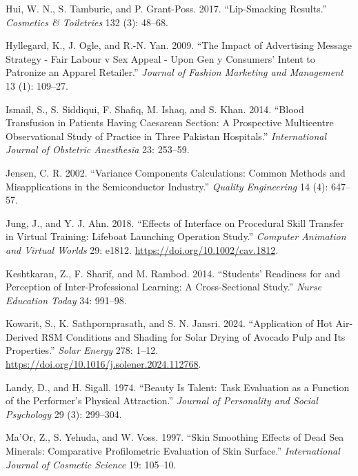 \documentclass[
]{book}
\newlength{\cslhangindent}
\newenvironment{CSLReferences}[2] %
 {\begin{list}{}{%
  \setlength{\itemindent}{0pt}
  \setlength{\leftmargin}{0pt}
  \setlength{\parsep}{0pt}
  \ifodd #1
   \setlength{\leftmargin}{\cslhangindent}
   \setlength{\itemindent}{-1\cslhangindent}
  \fi
  \setlength{\itemsep}{#2\baselineskip}}}
 {\end{list}}
\begin{document}
\begin{CSLReferences}{1}{0}
Hui, W. N., S. Tamburic, and P. Grant-Poss. 2017. {``Lip-Smacking
Results.''} \emph{Cosmetics \& Toiletries} 132 (3): 48--68.

Hyllegard, K., J. Ogle, and R.-N. Yan. 2009. {``The Impact of
Advertising Message Strategy - Fair Labour v Sex Appeal - Upon Gen y
Consumers' Intent to Patronize an Apparel Retailer.''} \emph{Journal of
Fashion Marketing and Management} 13 (1): 109--27.

Ismail, S., S. Siddiqui, F. Shafiq, M. Ishaq, and S. Khan. 2014.
{``Blood Transfusion in Patients Having Caesarean Section: A Prospective
Multicentre Observational Study of Practice in Three Pakistan
Hospitals.''} \emph{International Journal of Obstetric Anesthesia} 23:
253--59.

Jensen, C. R. 2002. {``Variance Components Calculations: Common Methods
and Misapplications in the Semiconductor Industry.''} \emph{Quality
Engineering} 14 (4): 647--57.

Jung, J., and Y. J. Ahn. 2018. {``Effects of Interface on Procedural
Skill Transfer in Virtual Training: Lifeboat Launching Operation
Study.''} \emph{Computer Animation and Virtual Worlds} 29: e1812.
\url{https://doi.org/10.1002/cav.1812}.

Keshtkaran, Z., F. Sharif, and M. Rambod. 2014. {``Students' Readiness
for and Perception of Inter-Professional Learning: A Cross-Sectional
Study.''} \emph{Nurse Education Today} 34: 991--98.

Kowarit, S., K. Sathpornprasath, and S. N. Jansri. 2024. {``Application
of Hot Air-Derived RSM Conditions and Shading for Solar Drying of
Avocado Pulp and Its Properties.''} \emph{Solar Energy} 278: 1--12.
\url{https://doi.org/10.1016/j.solener.2024.112768}.

Landy, D., and H. Sigall. 1974. {``Beauty Is Talent: Task Evaluation as
a Function of the Performer's Physical Attraction.''} \emph{Journal of
Personality and Social Psychology} 29 (3): 299--304.

Ma'Or, Z., S. Yehuda, and W. Voss. 1997. {``Skin Smoothing Effects of
Dead Sea Minerals: Comparative Profilometric Evaluation of Skin
Surface.''} \emph{International Journal of Cosmetic Science} 19:
105--10.


\end{CSLReferences}
\end{document}
